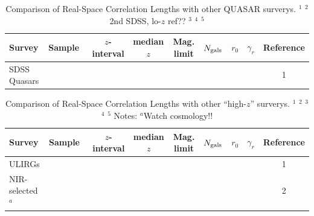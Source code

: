 \documentclass[usenatbib]{mn2e}
\begin{document}
\begin{table}
\baselineskip=20pt
\begin{center}
\setlength{\tabcolsep}{1pt}
\begin{tabular}{llcccrccc}
\hline
\hline
Survey            &   Sample\,\,\,  & $z$-interval &  median $z$     & Mag. limit & $N_{\rm gals}$ & $r_{0}$  & $\gamma_{r}$  & Reference   \\
\hline
\hline
SDSS Quasars     &                   &              &                 &            &             &           &              &  1 \\
\hline
\hline
\end{tabular}
\caption[Comparison of Real-Space Correlation Lengths with other surverys.]
{Comparison of Real-Space Correlation Lengths with other QUASAR surverys.
  $^1$\citet{Ross08a}
  $^2$2nd SDSS, lo-$z$ ref??
  $^3$\citet{Shen07}
  $^4$\citet{Croom05}
  $^5$\citet{Porciani06}
}
\label{tab:r_nought_comp_QSOs}

\end{center}
\end{table}



\begin{table}
\baselineskip=20pt
\begin{center}
\setlength{\tabcolsep}{1pt}
\begin{tabular}{llcccrccc}
\hline
\hline
Survey            &   Sample\,\,\,  & $z$-interval &  median $z$     & Mag. limit & $N_{\rm gals}$ & $r_{0}$  & $\gamma_{r}$  & Reference   \\
\hline
\hline
ULIRGs     &                   &              &                 &            &             &           &              &  1 \\
NIR-selected$^{a}$     &                   &              &                 &            &             &           &              &  2 \\
\hline
\hline
\end{tabular}
\caption[Comparison of Real-Space Correlation Lengths with other surverys.]
{Comparison of Real-Space Correlation Lengths with other ``high-$z$'' surverys.
  $^1$\citet{Farrah06, Farrah06Erratum}
  $^2$\citet{Daddi04}
  $^3$\citet{Blain03}
  $^4$\citet{Overzier03}
  $^5$
Notes: $^{a}$Watch cosmology!!
}
\label{tab:r_nought_comp_QSOs}

\end{center}
\end{table}
\end{document}

